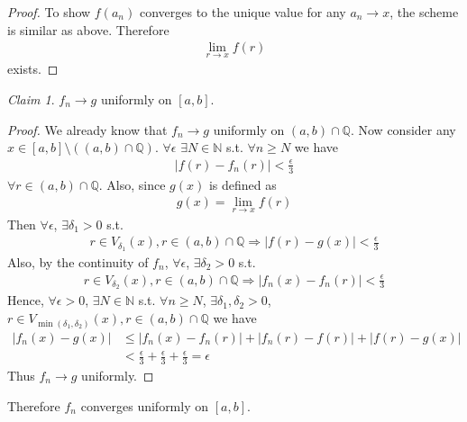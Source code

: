 \documentclass[twoside,11pt]{article}
\newcommand{\N}{\mathbb{N}}
\newcommand{\Q}{\mathbb{Q}}
\theoremstyle{definition}
\theoremstyle{remark}
\newtheorem*{claim}{Claim}
\begin{document}
\begin{enumerate}
\begin{proof}
    To show $f(a_n)$ converges to the unique value for any $a_n\rightarrow x$,
    the scheme is similar as above.
    Therefore
    \begin{align*}
        \lim_{r\rightarrow x}f(r) 
    \end{align*}
    exists.
\end{proof}
\begin{claim}
    $f_n\rightarrow g$ uniformly on $[a,b]$.
\end{claim}
\begin{proof}
    We already know that $f_n\rightarrow g$ uniformly on $(a, b)\cap \Q$.
    Now consider any $x\in [a,b]\setminus((a,b)\cap\Q)$.
    $\forall\epsilon$ $\exists N\in\N$ s.t. $\forall n\geq N$ we have
    \begin{align*}
        |f(r)-f_n(r)|<\frac{\epsilon}{3}
    \end{align*}
    $\forall r\in(a,b)\cap \Q$.
    Also, since $g(x)$ is defined as
    \begin{align*}
        g(x) = \lim_{r\rightarrow x}f(r)
    \end{align*}
    Then $\forall\epsilon$, $\exists\delta_1>0$ s.t.
    \begin{align*}
        r\in V_{\delta_1}(x), r\in(a,b)\cap\Q\Rightarrow
        |f(r) - g(x)|<\frac{\epsilon}{3}
    \end{align*}
    Also, by the continuity of $f_n$, $\forall\epsilon$,
    $\exists\delta_2>0$ s.t.
    \begin{align*}
        r\in V_{\delta_2}(x), r\in(a,b)\cap\Q\Rightarrow
        |f_n(x)-f_n(r)|<\frac{\epsilon}{3}
    \end{align*}
    Hence, $\forall\epsilon>0$, $\exists N\in\N$ s.t. $\forall n\geq N$,
    $\exists \delta_1,\delta_2>0$,
    $r\in V_{\min(\delta_1,\delta_2)}(x), r\in(a,b)\cap\Q$ we have
    \begin{align*}
        |f_n(x)-g(x)| &\leq |f_n(x)-f_n(r)| + |f_n(r)-f(r)| + |f(r)-g(x)|\\
        &<\frac{\epsilon}{3} + \frac{\epsilon}{3} + \frac{\epsilon}{3} = \epsilon
    \end{align*}
    Thus $f_n\rightarrow g$ uniformly.
\end{proof}
Therefore $f_n$ converges uniformly on $[a,b]$.



\end{enumerate}
\end{document}
